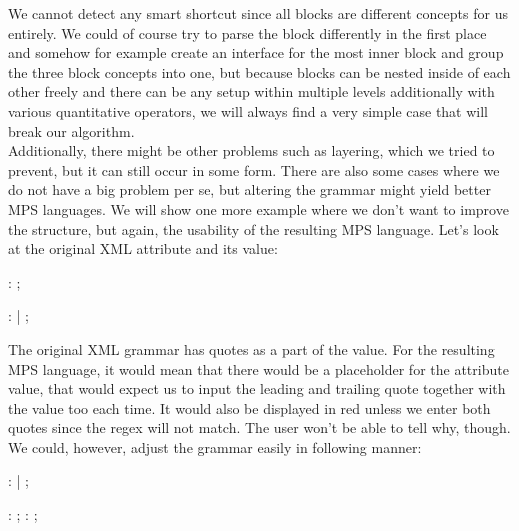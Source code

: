 We cannot detect any smart shortcut since all blocks are different concepts for us entirely. We could of course try to parse the block differently in the first place and somehow for example create an interface for the most inner block and group the three block concepts into one, but because blocks can be nested inside of each other freely and there can be any setup within multiple levels additionally with various quantitative operators, we will always find a very simple case that will break our algorithm.
\\

Additionally, there might be other problems such as layering, which we tried to prevent, but it can still occur in some form. There are also some cases where we do not have a big problem per se, but altering the grammar might yield better MPS languages. We will show one more example where we don't want to improve the structure, but again, the usability of the resulting MPS language. Let's look at the original XML attribute and its value:

\begin{antlr}
	   :    \literal{=}  ;

	      :    \regex{~["]*} 
	            |    \regex{~[']*} 
	            ;
\end{antlr}

The original XML grammar has quotes as a part of the value. For the resulting MPS language, it would mean that there would be a placeholder for the attribute value, that would expect us to input the leading and trailing quote together with the value too each time. It would also be displayed in red unless we enter both quotes since the regex will not match. The user won't be able to tell why, though. We could, however, adjust the grammar easily in following manner:

\begin{antlr}
	   :      
	            |      
	            ;

	       :   \regex{~["]*} ;
	       :   \regex{~[']*} ;
\end{antlr}

